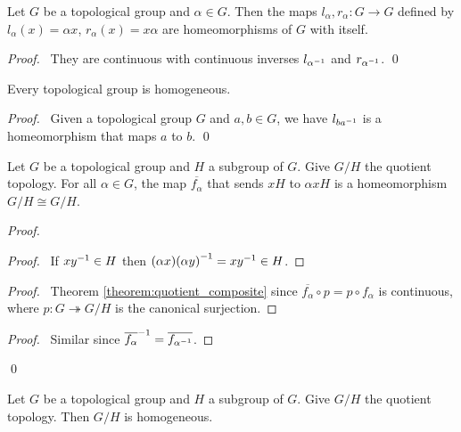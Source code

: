 \begin{proposition}
    Let $G$ be a topological group and $\alpha \in G$. Then the maps
    $l_\alpha, r_\alpha : G \rightarrow G$ defined by $l_\alpha(x) = \alpha x$,
    $r_\alpha(x) = x\alpha$ are homeomorphisms of $G$ with itself.
\end{proposition}

\begin{proof}
    \pf\ They are continuous with continuous inverses $l_{{\alpha}^{-1}}$ and
    $r_{{\alpha}^{-1}}$. \qed
\end{proof}

\begin{corollary}
    Every topological group is homogeneous.
\end{corollary}

\begin{proof}
    \pf\ Given a topological group $G$ and $a, b \in G$, we have $l_{b{a}^{-1}}$
    is a homeomorphism that maps $a$ to $b$. \qed
\end{proof}

\begin{proposition}
    Let $G$ be a topological group and $H$ a subgroup of $G$. Give $G / H$
    the quotient topology. For all $\alpha \in G$, the map $\overline{f_\alpha}$ that
    sends $xH$ to $\alpha xH$ is a homeomorphism $G / H \cong G / H$.    
\end{proposition}

\begin{proof}
    \pf
    \begin{proof}
        \pf\ If $x{y}^{-1} \in H$ then $(\alpha x) {(\alpha y)}^{-1} = x {y}^{-1}
        \in H$.
    \end{proof}
    \begin{proof}
        \pf\ Theorem \ref{theorem:quotient_composite} since $\overline{f_\alpha} \circ p
        = p \circ f_\alpha$ is continuous, where $p : G \twoheadrightarrow G / H$
        is the canonical surjection.
    \end{proof}
    \begin{proof}
        \pf\ Similar since ${\overline{f_\alpha}}^{-1} = \overline{f_{{\alpha}^{-1}}}$.
    \end{proof}
    \qed
\end{proof}

\begin{corollary}
    Let $G$ be a topological group and $H$ a subgroup of $G$. Give $G / H$
    the quotient topology. Then $G / H$ is homogeneous.
\end{corollary}

